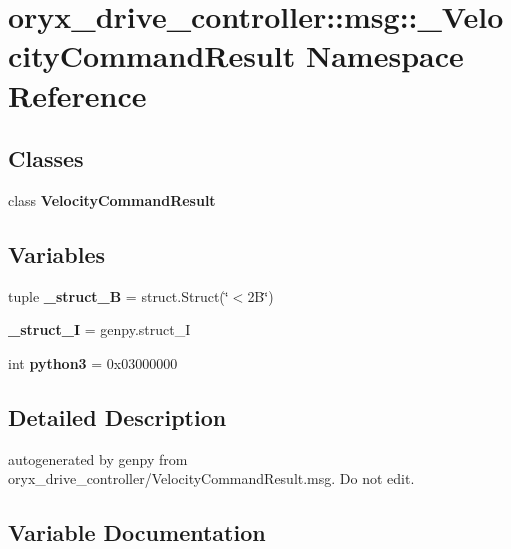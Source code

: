\section{oryx\-\_\-drive\-\_\-controller\-:\-:msg\-:\-:\-\_\-\-Velocity\-Command\-Result \-Namespace \-Reference}
\label{namespaceoryx__drive__controller_1_1msg_1_1__VelocityCommandResult}
\subsection*{\-Classes}
\begin{DoxyCompactItemize}
\item 
class {\bf \-Velocity\-Command\-Result}
\end{DoxyCompactItemize}
\subsection*{\-Variables}
\begin{DoxyCompactItemize}
\item 
tuple {\bf \-\_\-struct\-\_\-B} = struct.\-Struct(\char`\"{}$<$2\-B\char`\"{})
\item 
{\bf \-\_\-struct\-\_\-\-I} = genpy.\-struct\-\_\-\-I
\item 
int {\bf python3} = 0x03000000
\end{DoxyCompactItemize}


\subsection{\-Detailed \-Description}
\begin{DoxyVerb}autogenerated by genpy from oryx_drive_controller/VelocityCommandResult.msg. Do not edit.\end{DoxyVerb}
 

\subsection{\-Variable \-Documentation}
